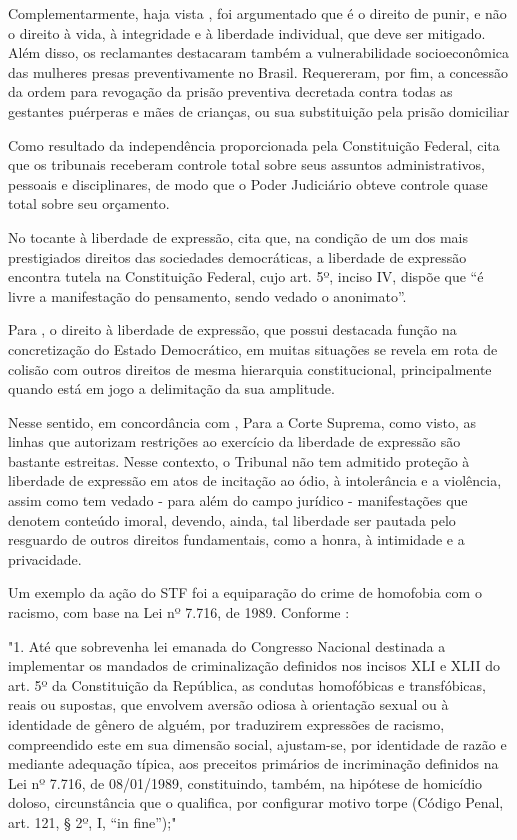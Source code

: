 Complementarmente, haja vista \cite{hc143641}, foi argumentado que é o direito de punir, e não o direito à vida, à  integridade e à liberdade individual, que deve ser mitigado. Além disso, os reclamantes destacaram também a vulnerabilidade socioeconômica das mulheres presas preventivamente no Brasil. Requereram, por fim, a concessão da ordem para revogação da prisão preventiva decretada contra todas as gestantes puérperas e mães de crianças, ou sua substituição pela prisão domiciliar

Como resultado da independência proporcionada pela Constituição Federal, \cite{pires2021paradoxo} cita que os tribunais receberam controle total sobre seus assuntos administrativos, pessoais e disciplinares, de modo que o Poder Judiciário obteve controle quase total sobre seu orçamento.

No tocante à liberdade de expressão, \cite{daliberdade} cita que, na condição de um dos mais prestigiados direitos das sociedades democráticas, a liberdade de expressão encontra tutela na Constituição Federal, cujo art. 5º, inciso IV, dispõe que “é livre a manifestação do pensamento, sendo vedado o anonimato”.

Para \cite{daliberdade}, o direito à liberdade de expressão, que possui destacada função na concretização do Estado Democrático, em muitas situações se revela em rota de colisão com outros direitos de mesma hierarquia constitucional, principalmente quando está em jogo a delimitação da sua amplitude. 

Nesse sentido, em concordância com \cite{daliberdade}, Para a Corte Suprema, como visto, as linhas que autorizam restrições ao exercício da liberdade de expressão são bastante estreitas. Nesse contexto, o Tribunal não tem admitido proteção à liberdade de expressão em atos de incitação ao ódio, à intolerância e a violência, assim como tem vedado - para além do campo jurídico - manifestações que denotem conteúdo imoral, devendo, ainda, tal liberdade ser pautada pelo resguardo de outros direitos
fundamentais, como a honra, à intimidade e a privacidade.

Um exemplo da ação do STF foi a equiparação do crime de homofobia com o racismo, com base na Lei nº 7.716, de 1989. Conforme \cite{ado26}:

\noindent
\begin{flushleft}
\setlength{\leftskip}{4cm}
\small
"1. Até que sobrevenha lei emanada do Congresso Nacional destinada a
implementar os mandados de criminalização definidos nos incisos XLI e XLII do
art. 5º da Constituição da República, as condutas homofóbicas e transfóbicas, reais ou
supostas, que envolvem aversão odiosa à orientação sexual ou à identidade de gênero de
alguém, por traduzirem expressões de racismo, compreendido este em sua dimensão
social, ajustam-se, por identidade de razão e mediante adequação típica, aos preceitos
primários de incriminação definidos na Lei nº 7.716, de 08/01/1989, constituindo,
também, na hipótese de homicídio doloso, circunstância que o qualifica, por configurar motivo torpe (Código Penal, art. 121, § 2º, I, “in fine”);" \cite{ado26}
\end{flushleft}

